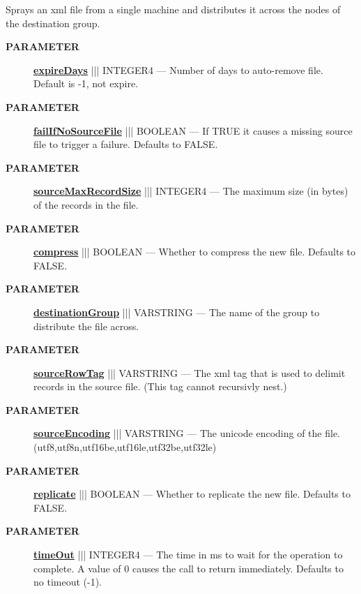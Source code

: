 \par





Sprays an xml file from a single machine and distributes it across the nodes of the destination group.






\par
\begin{description}
\item [\colorbox{tagtype}{\color{white} \textbf{\textsf{PARAMETER}}}] \textbf{\underline{expireDays}} ||| INTEGER4 --- Number of days to auto-remove file. Default is -1, not expire.
\item [\colorbox{tagtype}{\color{white} \textbf{\textsf{PARAMETER}}}] \textbf{\underline{failIfNoSourceFile}} ||| BOOLEAN --- If TRUE it causes a missing source file to trigger a failure. Defaults to FALSE.
\item [\colorbox{tagtype}{\color{white} \textbf{\textsf{PARAMETER}}}] \textbf{\underline{sourceMaxRecordSize}} ||| INTEGER4 --- The maximum size (in bytes) of the records in the file.
\item [\colorbox{tagtype}{\color{white} \textbf{\textsf{PARAMETER}}}] \textbf{\underline{compress}} ||| BOOLEAN --- Whether to compress the new file. Defaults to FALSE.
\item [\colorbox{tagtype}{\color{white} \textbf{\textsf{PARAMETER}}}] \textbf{\underline{destinationGroup}} ||| VARSTRING --- The name of the group to distribute the file across.
\item [\colorbox{tagtype}{\color{white} \textbf{\textsf{PARAMETER}}}] \textbf{\underline{sourceRowTag}} ||| VARSTRING --- The xml tag that is used to delimit records in the source file. (This tag cannot recursivly nest.)
\item [\colorbox{tagtype}{\color{white} \textbf{\textsf{PARAMETER}}}] \textbf{\underline{sourceEncoding}} ||| VARSTRING --- The unicode encoding of the file. (utf8,utf8n,utf16be,utf16le,utf32be,utf32le)
\item [\colorbox{tagtype}{\color{white} \textbf{\textsf{PARAMETER}}}] \textbf{\underline{replicate}} ||| BOOLEAN --- Whether to replicate the new file. Defaults to FALSE.
\item [\colorbox{tagtype}{\color{white} \textbf{\textsf{PARAMETER}}}] \textbf{\underline{timeOut}} ||| INTEGER4 --- The time in ms to wait for the operation to complete. A value of 0 causes the call to return immediately. Defaults to no timeout (-1).

\end{description}
